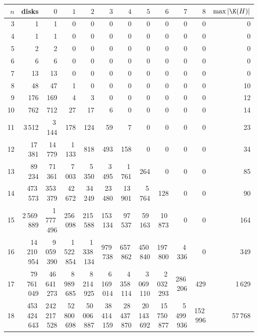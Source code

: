 \begin{tabular}{rrrrrrrrrrrr}\toprule
$n$ & disks & $0$ & $1$ & $2$ & $3$ & $4$ & $5$ & $6$ & $7$ & $8$ & $\max|\K(H)|$\\\midrule
3 & 1 & 1 & 0 & 0 & 0 & 0 & 0 & 0 & 0 & 0 & 0\\
4 & 1 & 1 & 0 & 0 & 0 & 0 & 0 & 0 & 0 & 0 & 0\\
5 & 2 & 2 & 0 & 0 & 0 & 0 & 0 & 0 & 0 & 0 & 0\\
6 & 6 & 6 & 0 & 0 & 0 & 0 & 0 & 0 & 0 & 0 & 0\\
7 & 13 & 13 & 0 & 0 & 0 & 0 & 0 & 0 & 0 & 0 & 0\\
8 & 48 & 47 & 1 & 0 & 0 & 0 & 0 & 0 & 0 & 0 & 10\\
9 & 176 & 169 & 4 & 3 & 0 & 0 & 0 & 0 & 0 & 0 & 12\\
10 & 762 & 712 & 27 & 17 & 6 & 0 & 0 & 0 & 0 & 0 & 14\\
11 & 3\,512 & 3\,144 & 178 & 124 & 59 & 7 & 0 & 0 & 0 & 0 & 23\\
12 & 17\,381 & 14\,779 & 1\,133 & 818 & 493 & 158 & 0 & 0 & 0 & 0 & 34\\
13 & 89\,234 & 71\,361 & 7\,003 & 5\,350 & 3\,495 & 1\,761 & 264 & 0 & 0 & 0 & 85\\
14 & 473\,573 & 353\,379 & 42\,672 & 34\,249 & 23\,480 & 13\,901 & 5\,764 & 128 & 0 & 0 & 90\\
15 & 2\,569\,889 & 1\,777\,496 & 256\,098 & 215\,588 & 153\,134 & 97\,537 & 59\,163 & 10\,873 & 0 & 0 & 164\\
16 & 14\,210\,954 & 9\,059\,390 & 1\,522\,854 & 1\,338\,134 & 979\,738 & 657\,862 & 450\,840 & 197\,800 & 4\,336 & 0 & 349\\
17 & 79\,761\,049 & 46\,641\,273 & 8\,989\,685 & 8\,214\,925 & 6\,169\,014 & 4\,358\,114 & 3\,069\,110 & 2\,032\,293 & 286\,206 & 429 & 1\,629\\
18 & 453\,424\,643 & 242\,217\,528 & 52\,800\,698 & 50\,006\,887 & 38\,414\,159 & 28\,437\,870 & 20\,143\,692 & 15\,750\,877 & 5\,499\,936 & 152\,996 & 57\,768\\
\bottomrule\end{tabular}
